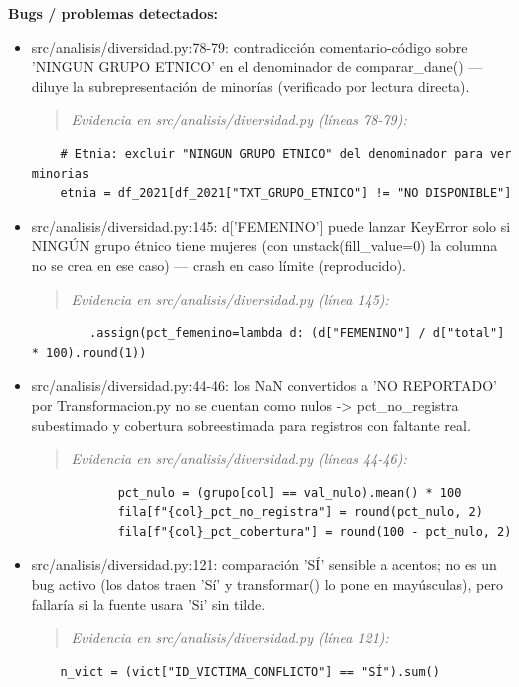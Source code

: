 \begin{tcolorbox}[riesgo]
\textbf{Bugs / problemas detectados:}
\begin{itemize}
  \item src/analisis/diversidad.py:78-79: contradicción comentario-código sobre 'NINGUN GRUPO ETNICO' en el denominador de comparar\_dane() --- diluye la subrepresentación de minorías (verificado por lectura directa).
\begin{quote}\footnotesize\ttfamily
\noindent\emph{Evidencia en src/analisis/diversidad.py (líneas 78-79):}
\end{quote}
\begin{lstlisting}
    # Etnia: excluir "NINGUN GRUPO ETNICO" del denominador para ver minorias
    etnia = df_2021[df_2021["TXT_GRUPO_ETNICO"] != "NO DISPONIBLE"]
\end{lstlisting}

  \item src/analisis/diversidad.py:145: d['FEMENINO'] puede lanzar KeyError solo si NINGÚN grupo étnico tiene mujeres (con unstack(fill\_value=0) la columna no se crea en ese caso) --- crash en caso límite (reproducido).
\begin{quote}\footnotesize\ttfamily
\noindent\emph{Evidencia en src/analisis/diversidad.py (línea 145):}
\end{quote}
\begin{lstlisting}
        .assign(pct_femenino=lambda d: (d["FEMENINO"] / d["total"] * 100).round(1))
\end{lstlisting}

  \item src/analisis/diversidad.py:44-46: los NaN convertidos a 'NO REPORTADO' por Transformacion.py no se cuentan como nulos -> pct\_no\_registra subestimado y cobertura sobreestimada para registros con faltante real.
\begin{quote}\footnotesize\ttfamily
\noindent\emph{Evidencia en src/analisis/diversidad.py (líneas 44-46):}
\end{quote}
\begin{lstlisting}
            pct_nulo = (grupo[col] == val_nulo).mean() * 100
            fila[f"{col}_pct_no_registra"] = round(pct_nulo, 2)
            fila[f"{col}_pct_cobertura"] = round(100 - pct_nulo, 2)
\end{lstlisting}

  \item src/analisis/diversidad.py:121: comparación 'SÍ' sensible a acentos; no es un bug activo (los datos traen 'Sí' y transformar() lo pone en mayúsculas), pero fallaría si la fuente usara 'Si' sin tilde.
\begin{quote}\footnotesize\ttfamily
\noindent\emph{Evidencia en src/analisis/diversidad.py (línea 121):}
\end{quote}
\begin{lstlisting}
    n_vict = (vict["ID_VICTIMA_CONFLICTO"] == "SÍ").sum()
\end{lstlisting}

\end{itemize}
\end{tcolorbox}

